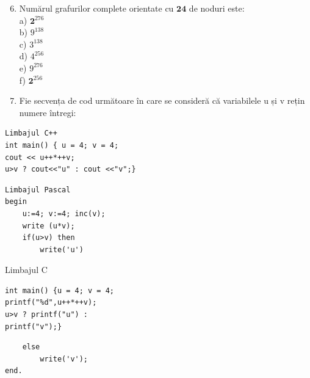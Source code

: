 \documentclass[10pt]{article}
\begin{document}
\begin{enumerate}
  \setcounter{enumi}{5}
  \item Numărul grafurilor complete orientate cu $\mathbf{2 4}$ de noduri este:\\
a) $\mathbf{2}^{276}$\\
b) $9^{138}$\\
c) $3^{138}$\\
d) $4^{256}$\\
e) $9^{276}$\\
f) $\mathbf{2}^{256}$
  \item Fie secvența de cod următoare în care se consideră că variabilele u și v rețin numere întregi:
\end{enumerate}

\begin{verbatim}
Limbajul C++
int main() { u = 4; v = 4;
cout << u++*++v;
u>v ? cout<<"u" : cout <<"v";}
\end{verbatim}

\begin{verbatim}
Limbajul Pascal
begin
    u:=4; v:=4; inc(v);
    write (u*v);
    if(u>v) then
        write('u')
\end{verbatim}

Limbajul C

\begin{verbatim}
int main() {u = 4; v = 4;
printf("%d",u++*++v);
u>v ? printf("u") :
printf("v");}
\end{verbatim}

\begin{verbatim}
    else
        write('v');
end.
\end{verbatim}
\end{document}

